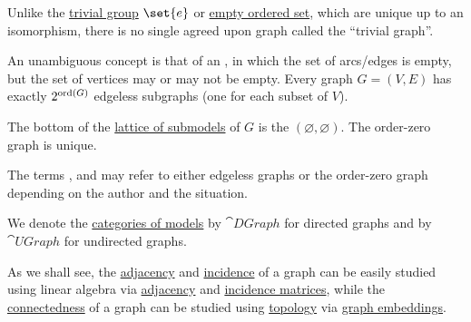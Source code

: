 \begin{definition}
\begin{thmenum}[resume=def:graph]
     Unlike the \hyperref[def:group/trivial]{trivial group} \( \set{ e } \) or \hyperref[def:partially_ordered_set/trivial]{empty ordered set}, which are unique up to an isomorphism, there is no single agreed upon graph called the \enquote{trivial graph}.

    An unambiguous concept is that of an , in which the set of arcs/edges is empty, but the set of vertices may or may not be empty. Every graph \( G = (V, E) \) has exactly \( 2^{\operatorname{ord}(G)} \) edgeless subgraphs (one for each subset of \( V \)).

    The bottom of the \hyperref[thm:substructures_form_complete_lattice]{lattice of submodels} of \( G \) is the  \( (\varnothing, \varnothing) \). The order-zero graph is unique.

    The terms ,  and  may refer to either edgeless graphs or the order-zero graph depending on the author and the situation.

     We denote the \hyperref[def:category_of_first_order_models]{categories of models} by \( \cat{DGraph} \) for directed graphs and by \( \cat{UGraph} \) for undirected graphs.
  \end{thmenum}
\end{definition}

\begin{remark}\label{rem:graphs_linear_algebra_and_topology}
  As we shall see, the \hyperref[def:graph]{adjacency} and \hyperref[def:graph_incidence]{incidence} of a graph can be easily studied using linear algebra via \hyperref[def:graph_matrices/adjacency]{adjacency} and \hyperref[def:graph_matrices/incidence]{incidence matrices}, while the \hyperref[def:graph_connectedness]{connectedness} of a graph can be studied using \hyperref[def:graph_connectedness]{topology} via \hyperref[def:graph_geometric_relization/embedding]{graph embeddings}.
\end{remark}

